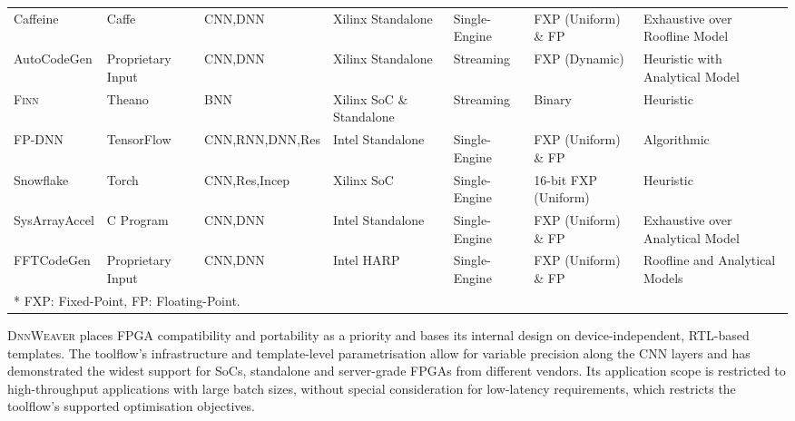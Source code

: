 \documentclass[format=acmsmall, review=false, screen=true]{acmart}
\begin{document}
\begin{table*}[t]
{\begin{tabular}{l l l l l l l}
		Caffeine \cite{Zhang_2016} & Caffe & CNN,DNN & Xilinx Standalone & Single-Engine & FXP (Uniform) \& FP & Exhaustive over Roofline Model \\
		
		{\color{black}AutoCodeGen \cite{Zhiqiang_Liu_2016}} & {\color{black} Proprietary Input} & {\color{black}CNN,DNN} & {\color{black} Xilinx Standalone} & {\color{black}Streaming} & {\color{black}FXP (Dynamic)} & {\color{black}Heuristic with Analytical Model} \\
		
		\textsc{Finn} \cite{Umuroglu_2017}\cite{Fraser_2017} & Theano & BNN & Xilinx SoC \& Standalone & Streaming & Binary & Heuristic \\
		
		FP-DNN \cite{Guan2017} & TensorFlow &  CNN,RNN,DNN,Res & Intel Standalone  & Single-Engine & FXP (Uniform) \& FP  & Algorithmic \\
		
		{\color{black}Snowflake \cite{Gokhale2017}\cite{Chang_2017}} & {\color{black} Torch} & {\color{black}CNN,Res,Incep} & {\color{black}Xilinx SoC} & {\color{black}Single-Engine} & {\color{black}16-bit FXP (Uniform)} & {\color{black}Heuristic} \\
		
		SysArrayAccel \cite{Wei2017} & C Program & CNN,DNN & Intel Standalone & Single-Engine & FXP (Uniform) \& FP  & Exhaustive over Analytical Model \\
		
		{\color{black}FFTCodeGen \cite{fft2017fpga}\cite{fftcodegen2017rpt}\cite{fft2017reconfig}\cite{fft2018fpga}} & {\color{black}Proprietary Input} & {\color{black}CNN,DNN} & {\color{black}Intel HARP} & {\color{black}Single-Engine} & {\color{black}FXP (Uniform) \& FP}  & {\color{black}Roofline and Analytical Models} \\
		
	\multicolumn{3}{l}{* FXP: Fixed-Point, FP: Floating-Point.} \\
		\bottomrule
	\end{tabular}
}
\vspace{-0.65cm}
\end{table*}

\textsc{DnnWeaver} places FPGA compatibility and portability as a priority and bases its internal design on device-independent, RTL-based templates. The toolflow's infrastructure and template-level parametrisation allow for variable precision along the CNN layers and has demonstrated the widest support for SoCs, standalone and server-grade FPGAs from different vendors. Its application scope is restricted to high-throughput applications with large batch sizes, without special consideration for low-latency requirements, which restricts the toolflow's supported optimisation objectives.
\end{document}

